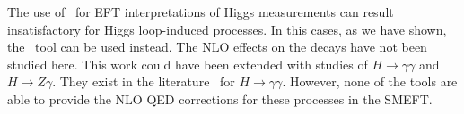 The use of \SMEFTsim\ for EFT interpretations of Higgs measurements can result insatisfactory for Higgs loop-induced processes. In this cases, as we have shown, the \SMEFTatNLO\ tool can be used instead. The NLO effects on the decays have not been studied here. This work could have been extended with studies of $H\to \gamma\gamma$ and $ H\to Z\gamma$. They exist in the literature~\cite{Dawson:2018liq} for $H\to \gamma\gamma$. However, none of the tools are able to provide the NLO QED corrections for these processes in the SMEFT.



~\newline~

\let\Herwig\undefined
\let\Pythia\undefined
\let\Sherpa\undefined
\let\Rivet\undefined
\let\Professor\undefined
\let\eps\undefined
\let\mc\undefined
\let\mr\undefined
\let\mb\undefined
\let\tm\undefined




